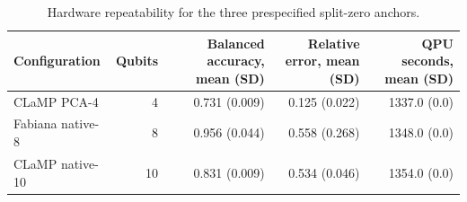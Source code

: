 \begin{table}[tbp]
\caption{Hardware repeatability for the three prespecified split-zero anchors.}
\label{tab:anchor-repeatability}
\begin{tabular}{lrrrr}
\toprule
Configuration & Qubits & Balanced accuracy, mean (SD) & Relative error, mean (SD) & QPU seconds, mean (SD) \\
\midrule
CLaMP PCA-4 & 4 & 0.731 (0.009) & 0.125 (0.022) & 1337.0 (0.0) \\
Fabiana native-8 & 8 & 0.956 (0.044) & 0.558 (0.268) & 1348.0 (0.0) \\
CLaMP native-10 & 10 & 0.831 (0.009) & 0.534 (0.046) & 1354.0 (0.0) \\
\bottomrule
\end{tabular}
\end{table}
